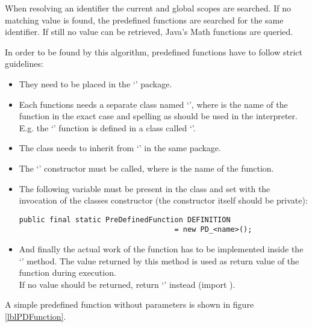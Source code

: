 When resolving an identifier the current and global scopes are searched. If no matching value is found, the predefined functions are searched for the same identifier. If still no value can be retrieved, Java's Math functions are queried.

In order to be found by this algorithm, predefined functions have to follow strict guidelines:

\begin{itemize}
	\item They need to be placed in the `' package.
	\item Each functions needs a separate class named `', where  is the name of the function in the exact case and spelling as should be used in the interpreter.\\
		E.g. the `' function is defined in a class called `'.
	\item The class needs to inherit from `' in the same package.
	\item The `' constructor must be called, where  is the name of the function.
	\item The following variable must be present in the class and set with the invocation of the classes constructor (the constructor itself should be private):
\begin{lstlisting}[frame=none,numbers=none]
public final static PreDefinedFunction DEFINITION
                                    = new PD_<name>();
\end{lstlisting}
	\item And finally the actual work of the function has to be implemented inside the `' method. The value returned by this method is used as return value of the function during execution.\\
	If no value should be returned, return `' instead (import ).

\end{itemize}

A simple predefined function without parameters is shown in figure \ref{lblPDFunction}.



